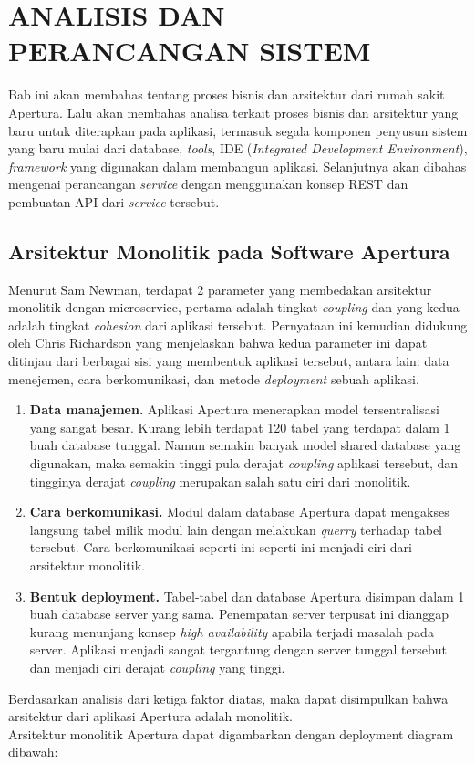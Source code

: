\chapter{ANALISIS DAN PERANCANGAN SISTEM}


%
\vspace{4.5pt}

Bab ini akan membahas tentang proses bisnis dan arsitektur dari rumah sakit Apertura. Lalu akan membahas analisa terkait proses bisnis dan arsitektur yang baru untuk diterapkan pada aplikasi, termasuk segala komponen penyusun sistem yang baru mulai dari database, \textit{tools}, IDE (\textit{Integrated Development Environment}), \textit{framework} yang digunakan dalam membangun aplikasi. Selanjutnya akan dibahas mengenai perancangan \textit{service} dengan menggunakan konsep REST dan pembuatan API dari \textit{service} tersebut.
\section{Arsitektur Monolitik pada Software Apertura}
Menurut Sam Newman, terdapat 2 parameter yang membedakan arsitektur monolitik dengan microservice, pertama adalah tingkat \textit{coupling} dan yang kedua adalah tingkat \textit{cohesion} dari aplikasi tersebut. Pernyataan ini kemudian didukung oleh Chris Richardson yang menjelaskan bahwa kedua parameter ini dapat ditinjau dari berbagai sisi yang membentuk aplikasi tersebut, antara lain: data menejemen, cara berkomunikasi, dan metode \textit{deployment} sebuah aplikasi.

\begin{enumerate}[leftmargin=*]
	\item \textbf{Data manajemen.} Aplikasi Apertura menerapkan model tersentralisasi yang sangat besar. Kurang lebih terdapat 120 tabel yang terdapat dalam 1 buah database tunggal. Namun semakin banyak model shared database yang digunakan, maka semakin tinggi pula derajat \textit{coupling} aplikasi tersebut, dan tingginya derajat \textit{coupling} merupakan salah satu ciri dari monolitik.
	\item \textbf{Cara berkomunikasi.} Modul dalam database Apertura dapat mengakses langsung tabel milik modul lain dengan melakukan \textit{querry} terhadap tabel tersebut. Cara berkomunikasi seperti ini seperti ini menjadi ciri dari arsitektur monolitik.
	\item \textbf{Bentuk deployment.} Tabel-tabel dan database Apertura disimpan dalam 1 buah database server yang sama. Penempatan server terpusat ini dianggap kurang menunjang konsep \textit{high availability} apabila terjadi masalah pada server. Aplikasi menjadi sangat tergantung dengan server tunggal tersebut dan menjadi ciri derajat \textit{coupling} yang tinggi.
\end{enumerate}
\newpage
Berdasarkan analisis dari ketiga faktor diatas, maka dapat disimpulkan bahwa arsitektur dari aplikasi Apertura adalah monolitik.\\
Arsitektur monolitik Apertura dapat digambarkan dengan deployment diagram dibawah:

